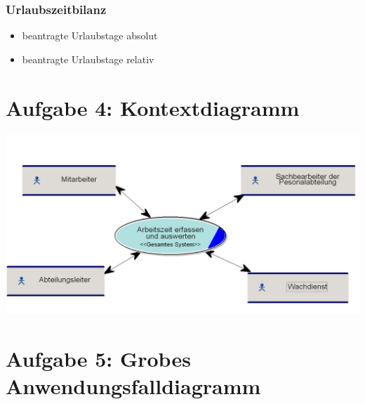 \subsection{Urlaubszeitbilanz}
\begin{itemize}[label=+]
\item[] beantragte Urlaubstage absolut
\item beantragte Urlaubstage relativ
\end{itemize}

\chapter*{Aufgabe 4: Kontextdiagramm}
\setcounter{section}{0}
\addtocounter{chapter}{1}


\begin{center}
	\includegraphics[scale=0.4]{Kontextdiagramm.PNG}
\end{center}

\chapter*{Aufgabe 5: Grobes Anwendungsfalldiagramm}
\setcounter{section}{0}
\addtocounter{chapter}{1}

